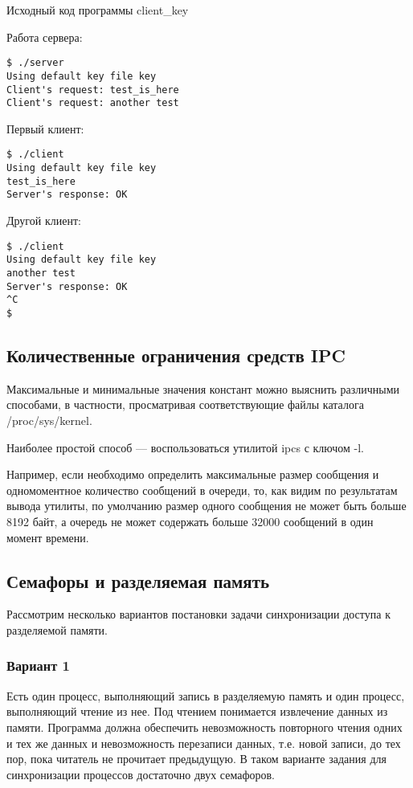\documentclass[a4paper]{article}
\begin{document}
		
	Исходный код программы client\_key
	
	
	Работа сервера:
	\begin{lstlisting}[style=crs_bash]
$ ./server    
Using default key file key
Client's request: test_is_here
Client's request: another test
	\end{lstlisting}
	
	Первый клиент:
	\begin{lstlisting}[style=crs_bash]
$ ./client 
Using default key file key
test_is_here
Server's response: OK

	\end{lstlisting}
	
	Другой клиент:
	\begin{lstlisting}[style=crs_bash]
$ ./client 
Using default key file key
another test
Server's response: OK
^C
$
	\end{lstlisting}
	
\subsection{Количественные ограничения средств IPC}
	Максимальные и минимальные значения констант можно выяснить различными способами, в частности, просматривая соответствующие файлы каталога /proc/sys/kernel.
	
	Наиболее простой способ --– воспользоваться утилитой ipcs с ключом -l.
	
	
	Например, если необходимо определить максимальные размер сообщения и одномоментное количество сообщений в очереди, то, как видим по результатам вывода утилиты, по умолчанию размер одного сообщения не может быть больше 8192 байт, а очередь не может содержать больше 32000 сообщений в один момент времени.
	
\subsection{Семафоры и разделяемая память}
	Рассмотрим несколько вариантов постановки задачи синхронизации доступа к разделяемой памяти.
	
	\subsubsection{Вариант 1}	
	Есть один процесс, выполняющий запись в разделяемую память и один процесс, выполняющий чтение из нее. Под чтением понимается извлечение данных из памяти. Программа должна обеспечить невозможность повторного чтения одних и тех же данных и невозможность перезаписи данных, т.е. новой записи, до тех пор, пока читатель не прочитает предыдущую.
В таком варианте задания для синхронизации процессов достаточно двух семафоров.
\end{document}
